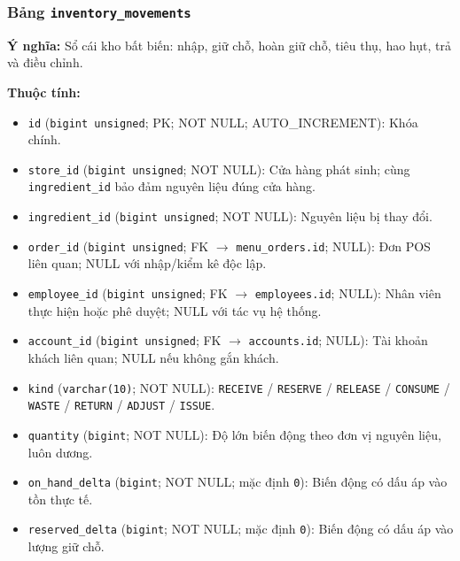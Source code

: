 \subsubsection{Bảng \texttt{inventory\_movements}}

\textbf{Ý nghĩa:} Sổ cái kho bất biến: nhập, giữ chỗ, hoàn giữ chỗ, tiêu thụ, hao hụt, trả và điều chỉnh.\par

\textbf{Thuộc tính:}

\begin{itemize}

\item \texttt{id} (\texttt{bigint unsigned}; PK; NOT NULL; AUTO_INCREMENT): Khóa chính.

\item \texttt{store\_id} (\texttt{bigint unsigned}; NOT NULL): Cửa hàng phát sinh; cùng \texttt{ingredient\_id} bảo đảm nguyên liệu đúng cửa hàng.

\item \texttt{ingredient\_id} (\texttt{bigint unsigned}; NOT NULL): Nguyên liệu bị thay đổi.

\item \texttt{order\_id} (\texttt{bigint unsigned}; FK $\rightarrow$ \texttt{menu\_orders.id}; NULL): Đơn POS liên quan; NULL với nhập/kiểm kê độc lập.

\item \texttt{employee\_id} (\texttt{bigint unsigned}; FK $\rightarrow$ \texttt{employees.id}; NULL): Nhân viên thực hiện hoặc phê duyệt; NULL với tác vụ hệ thống.

\item \texttt{account\_id} (\texttt{bigint unsigned}; FK $\rightarrow$ \texttt{accounts.id}; NULL): Tài khoản khách liên quan; NULL nếu không gắn khách.

\item \texttt{kind} (\texttt{varchar(10)}; NOT NULL): \texttt{RECEIVE} / \texttt{RESERVE} / \texttt{RELEASE} / \texttt{CONSUME} / \texttt{WASTE} / \texttt{RETURN} / \texttt{ADJUST} / \texttt{ISSUE}.

\item \texttt{quantity} (\texttt{bigint}; NOT NULL): Độ lớn biến động theo đơn vị nguyên liệu, luôn dương.

\item \texttt{on\_hand\_delta} (\texttt{bigint}; NOT NULL; mặc định \texttt{0}): Biến động có dấu áp vào tồn thực tế.

\item \texttt{reserved\_delta} (\texttt{bigint}; NOT NULL; mặc định \texttt{0}): Biến động có dấu áp vào lượng giữ chỗ.


\end{itemize}
